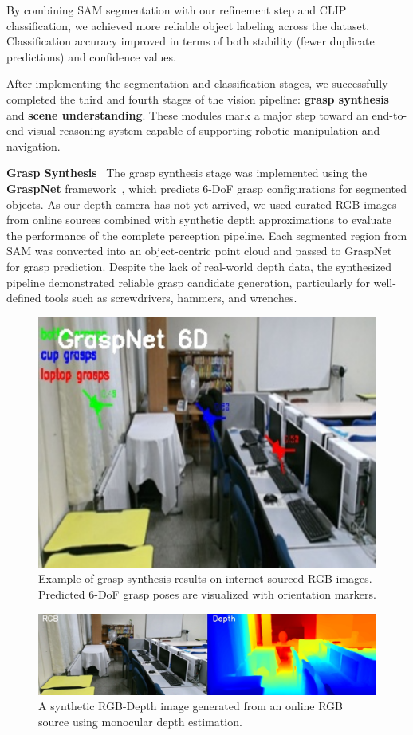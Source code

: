 \documentclass[12pt]{extarticle}
\begin{document}
By combining SAM segmentation with our refinement step and CLIP classification, we achieved more reliable object labeling across the dataset. Classification accuracy improved in terms of both stability (fewer duplicate predictions) and confidence values.

After implementing the segmentation and classification stages, we successfully completed the third and fourth stages of the vision pipeline: \textbf{grasp synthesis} and \textbf{scene understanding}. These modules mark a major step toward an end-to-end visual reasoning system capable of supporting robotic manipulation and navigation. \

\textbf{Grasp Synthesis} \
The grasp synthesis stage was implemented using the \textbf{GraspNet} framework~\cite{hanwen2024_grasp}, which predicts 6-DoF grasp configurations for segmented objects. As our depth camera has not yet arrived, we used curated RGB images from online sources combined with synthetic depth approximations to evaluate the performance of the complete perception pipeline. Each segmented region from SAM was converted into an object-centric point cloud and passed to GraspNet for grasp prediction. Despite the lack of real-world depth data, the synthesized pipeline demonstrated reliable grasp candidate generation, particularly for well-defined tools such as screwdrivers, hammers, and wrenches.

\begin{figure}[htbp]
\centering
\includegraphics[width=0.5\linewidth]{images/graspnet_img.png}
\caption{Example of grasp synthesis results on internet-sourced RGB images. Predicted 6-DoF grasp poses are visualized with orientation markers.}
\label{fig: grasp_result}
\end{figure}


\begin{figure}[htbp]
\centering
\includegraphics[width=\linewidth]{images/RGB-Dep.png}
\caption{A synthetic RGB-Depth image generated from an online RGB source using monocular depth estimation.}
\label{fig: grasp_result}
\end{figure}
\end{document}
